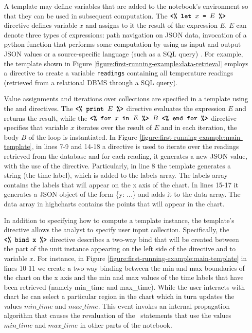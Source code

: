  A template may define variables that are added to the notebook's environment so that they can be used in subsequent computation. The $\texttt{\textbf{<\% let }} x \texttt{\textbf{ = }} E \texttt{\textbf{ \%>}}$ directive defines variable $x$ and assigns to it the result of the expression $E$. $E$ can denote three types of expressions: path navigation on JSON data, invocation of a python function that performs some computation by using as input and output JSON values or a source-specific language (such as a SQL query) . For example, the template shown in Figure \ref{figure:first-running-example:data-retrieval} employs a  directive to create a variable \texttt{readings} containing all temperature readings (retrieved from a relational DBMS through a SQL query).

 Value assignments and iterations over collections are specified in a template using the  and  directives. The $\texttt{\textbf{<\% print }} E \texttt{\textbf{ \%>}}$ directive evaluates the expression $E$ and returns the result, while the $\texttt{\textbf{<\% for }} x \texttt{\textbf{ in }} E \texttt{\textbf{ \%> }} B \texttt{\textbf{ <\% end for \%>}}$ directive specifies that variable $x$ iterates over the result of $E$ and in each iteration, the body $B$ of the  loop is instantiated. In Figure \ref{figure:first-running-example:main-template}, in lines 7-9 and 14-18 a  directive is used to iterate over the readings retrieved from the database and for each reading, it generates a new JSON value, with the use of the  directive. Particularly, in line 8 the template generates a string (the time label), which is added to the labels array. The labels array contains the labels that will appear on the x axis of the chart. In lines 15-17 it generates a JSON object of the form \{y: ...\} and adds it to the data array. The data array in highcharts contains the points that will appear in the chart.

 In addition to specifying how to compute a template instance, the template's  directive allows the analyst to specify user input collection. Specifically, the $\texttt{\textbf{<\% bind x}} \texttt{\textbf{ \%>}}$ directive describes a two-way bind that will be created between the part of the unit instance appearing on the left side of the directive and to variable $x$. For instance, in Figure \ref{figure:first-running-example:main-template} in lines 10-11 we create a two-way binding between the min and max boundaries of the chart on the x axis and the min and max values of the time labels that have been retrieved (namely min\_time and max\_time). While the user interacts with chart he can select a particular region in the chart which in turn updates the values $min\_time$ and $max\_time$. This event invokes an internal propagation algorithm that causes the revaluation of the \projname\ statements that use the values $min\_time$ and $max\_time$ in other parts of the notebook.

